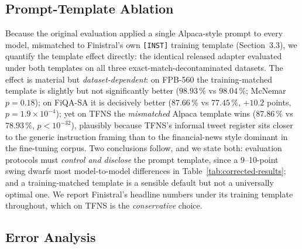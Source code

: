 \documentclass[a4paper]{article}
\begin{document}
\subsection{Prompt-Template Ablation}

Because the original evaluation applied a single Alpaca-style prompt to every model, mismatched to Finistral's own \texttt{[INST]} training template (Section~3.3), we quantify the template effect directly: the identical released adapter evaluated under both templates on all three exact-match-decontaminated datasets. The effect is material but \emph{dataset-dependent}: on FPB-560 the training-matched template is slightly but not significantly better ($98.93\,\%$ vs $98.04\,\%$; McNemar $p = 0.18$); on FiQA-SA it is decisively better ($87.66\,\%$ vs $77.45\,\%$, $+10.2$ points, $p = 1.9\times10^{-4}$); yet on TFNS the \emph{mismatched} Alpaca template wins ($87.86\,\%$ vs $78.93\,\%$, $p < 10^{-32}$), plausibly because TFNS's informal tweet register sits closer to the generic instruction framing than to the financial-news style dominant in the fine-tuning corpus. Two conclusions follow, and we state both: evaluation protocols must \emph{control and disclose} the prompt template, since a 9--10-point swing dwarfs most model-to-model differences in Table~\ref{tab:corrected-results}; and a training-matched template is a sensible default but not a universally optimal one. We report Finistral's headline numbers under its training template throughout, which on TFNS is the \emph{conservative} choice.

\subsection{Error Analysis}
\end{document}
